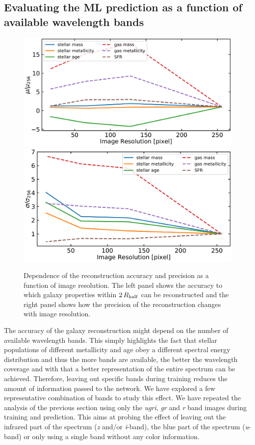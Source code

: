 \documentclass[useAMS,usenatbib]{mnras}
\begin{document}
\subsection{Evaluating the ML prediction as a function of available wavelength bands}
\label{sec:bands}

\begin{figure}
\begin{center}
\includegraphics[width=.5\textwidth]{./plots/res_comparison_mu.pdf}
\includegraphics[width=.4875\textwidth]{./plots/res_comparison_sigma.pdf}
\end{center}
\vspace{-.35cm}
\caption{Dependence of the reconstruction accuracy and precision as a function of image resolution. The left panel shows the accuracy to which galaxy properties within $2\,R_{\rm half}$ can be reconstructed and the right panel shows how the precision of the reconstruction changes with image resolution.}
\label{fig:res_comp}
\end{figure}

The accuracy of the galaxy reconstruction might depend on the number of available wavelength bands. This simply highlights the fact that stellar populations of different metallicity and age obey a different spectral energy distribution and thus the more bands are available, the better the wavelength coverage and with that a better representation of the entire spectrum can be achieved. Therefore, leaving out specific bands during training reduces the amount of information passed to the network. We have explored a few representative combination of bands to study this effect. We have repeated the analysis of the previous section using only the \emph{ugri}, \emph{gr} and \emph{r} band images during training and prediction. This aims at probing the effect of leaving out the infrared part of the spectrum (\emph{z} and/or \emph{i}-band), the blue part of the spectrum (\emph{u}-band) or only using a single band without any color information. 
\end{document}
